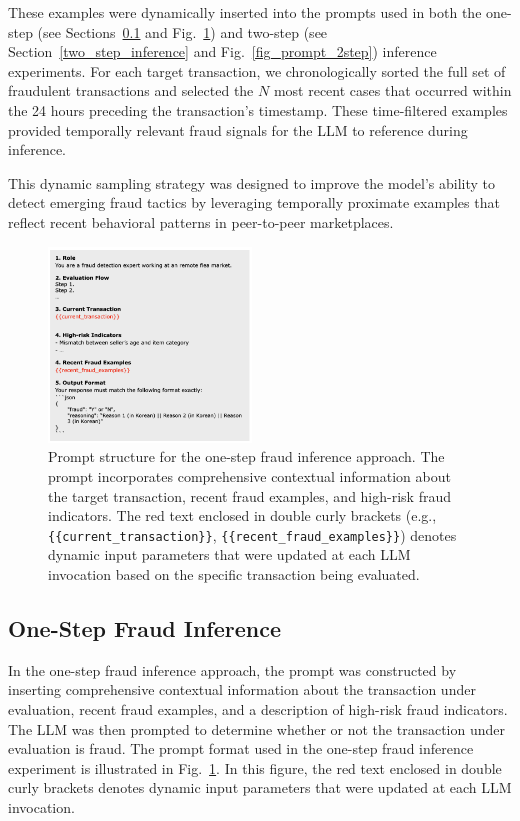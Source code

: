 \documentclass[sigconf]{acmart}
\begin{document}
These examples were dynamically inserted into the prompts used in both the one-step (see Sections~\ref{one_step_inference} and Fig.~\ref{fig_prompt_1step}) and two-step (see Section~\ref{two_step_inference} and Fig.~\ref{fig_prompt_2step}) inference experiments. For each target transaction, we chronologically sorted the full set of fraudulent transactions and selected the $N$ most recent cases that occurred within the 24 hours preceding the transaction's timestamp. These time-filtered examples provided temporally relevant fraud signals for the LLM to reference during inference.

This dynamic sampling strategy was designed to improve the model's ability to detect emerging fraud tactics by leveraging temporally proximate examples that reflect recent behavioral patterns in peer-to-peer marketplaces.



\begin{figure}[b!]
  \centering
  \includegraphics[width=0.48\textwidth]{./figures/fig_prompt_1step.png}
  \caption{Prompt structure for the one-step fraud inference approach. The prompt incorporates comprehensive contextual information about the target transaction, recent fraud examples, and high-risk fraud indicators. The red text enclosed in double curly brackets (e.g., \texttt{\{\{current\_transaction\}\}}, \texttt{\{\{recent\_fraud\_examples\}\}}) denotes dynamic input parameters that were updated at each LLM invocation based on the specific transaction being evaluated.}
\label{fig_prompt_1step}
\end{figure}




\subsection{One-Step Fraud Inference}\label{one_step_inference}
In the one-step fraud inference approach, the prompt was constructed by inserting comprehensive contextual information about the transaction under evaluation, recent fraud examples, and a description of high-risk fraud indicators. The LLM was then prompted to determine whether or not the transaction under evaluation is fraud. The prompt format used in the one-step fraud inference experiment is illustrated in Fig.~\ref{fig_prompt_1step}. In this figure, the red text enclosed in double curly brackets denotes dynamic input parameters that were updated at each LLM invocation.
\end{document}
